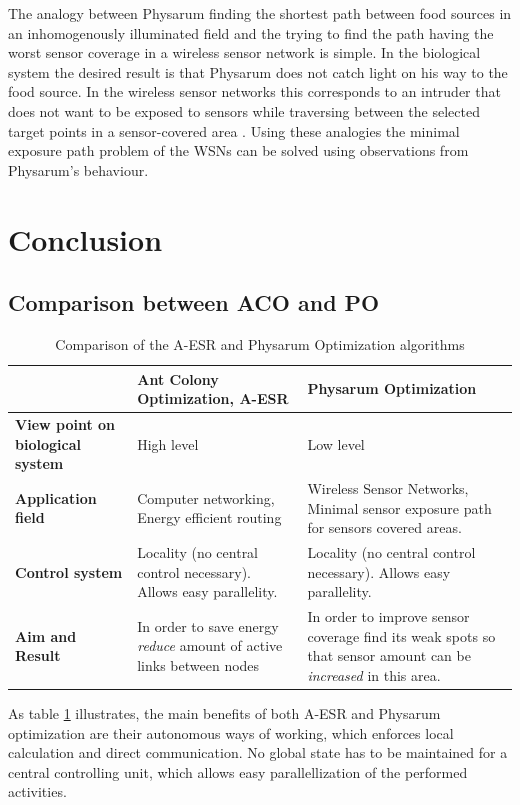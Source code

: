 \documentclass[cameraready]{IWORK2014}
\begin{document}
The analogy between Physarum finding the shortest path between food sources in an inhomogenously illuminated field and the trying to find the path having the worst sensor coverage in a wireless sensor network is simple. In the biological system the desired result is that Physarum does not catch light on his way to the food source. In the wireless sensor networks this corresponds to an intruder that does not want to be exposed to sensors while traversing between the selected target points in a sensor-covered area \cite{liu2012physarum}. Using these analogies the minimal exposure path problem of the WSNs can be solved using observations from Physarum's behaviour.

\section{Conclusion}

\subsection{Comparison between ACO and PO}

\begin{table}
	\begin{tabularx}{0.90\textwidth}{|X|X|X|}
		\hline & \textbf{Ant Colony Optimization, A-ESR} & \textbf{Physarum Optimization} \\ \hline
		\textbf{View point on biological system} & High level & Low level \\ \hline
		\textbf{Application field} & Computer networking, Energy efficient routing & Wireless Sensor Networks, Minimal sensor exposure path for sensors covered areas. \\ 	\hline
		\textbf{Control system} & Locality (no central control necessary). Allows easy parallelity. & Locality (no central control necessary). Allows easy parallelity. \\ \hline
		\textbf{Aim and Result} & In order to save energy \textit{reduce} amount of active links between nodes & In order to improve sensor coverage find its weak spots so that sensor amount can be \textit{increased} in this area. \\ \hline
	\end{tabularx}
	\caption{Comparison of the A-ESR and Physarum Optimization algorithms}
	\label{tbl:aco-po-comparison}
\end{table}

As table \ref{tbl:aco-po-comparison} illustrates, the main benefits of both A-ESR and Physarum optimization are their autonomous ways of working, which enforces local calculation and direct communication. No global state has to be maintained for a central controlling unit, which allows easy parallellization of the performed activities.
\end{document}
